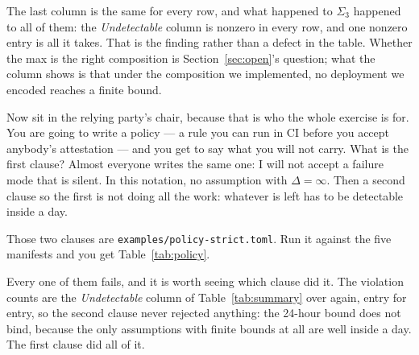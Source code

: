\documentclass[11pt]{article}
\newcommand{\parallax}{\texttt{parallax}}
\newcommand{\Never}{\infty}
\newcommand{\ub}{\_\allowbreak}
\begin{document}
\begin{table}[h]
\centering\small
\caption{Every encoded deployment, from \texttt{parallax tiers --format
tex-summary}. \emph{Undetectable} counts assumptions with $\Delta = \Never$.
Principals is lower than $|T|$ only for $\Sigma_5$, where one party is
trusted for two different capabilities --- which is the shared dependency of
Section~\ref{sec:shared} showing up as a number.}
\label{tab:summary}

\end{table}

The last column is the same for every row, and what happened to $\Sigma_3$
happened to all of them: the \emph{Undetectable} column is nonzero in every
row, and one nonzero entry is all it takes. That is the finding rather than a
defect in the table. Whether the max is the right composition is
Section~\ref{sec:open}'s question; what the column shows is that under the
composition we implemented, no deployment we encoded reaches a finite bound.

Now sit in the relying party's chair, because that is who the whole exercise
is for. You are going to write a policy --- a rule you can run in CI before
you accept anybody's attestation --- and you get to say what you will not
carry. What is the first clause? Almost everyone writes the same one: I will
not accept a failure mode that is silent. In this notation, no assumption
with $\Delta = \Never$. Then a second clause so the first is not doing all
the work: whatever is left has to be detectable inside a day.

Those two clauses are \texttt{examples/policy-strict.toml}. Run it against the
five manifests and you get Table~\ref{tab:policy}.

Every one of them fails, and it is worth seeing which clause did it. The
violation counts are the \emph{Undetectable} column of
Table~\ref{tab:summary} over again, entry for entry, so the second clause
never rejected anything: the 24-hour bound does not bind, because the only
assumptions with finite bounds at all are well inside a day. The first clause
did all of it.

\begin{table}[h]
\centering\small
\caption{Each manifest against \texttt{examples/policy-strict.toml}
(\texttt{forbid\ub undetectable = true}, \texttt{max\ub detection\ub latency
= "24h"}), from \texttt{parallax check}. \parallax{} exits 1 on violations,
so this is a gate a relying party could run in CI. On this evidence it is a
gate that rejects everything.}
\label{tab:policy}

\end{table}
\end{document}
